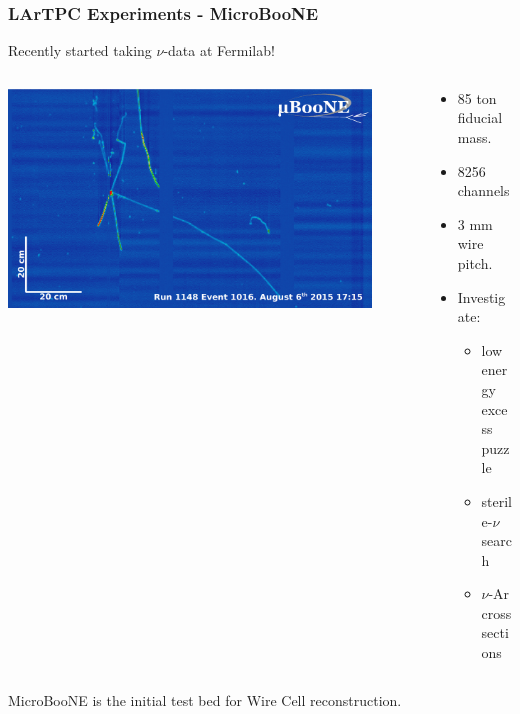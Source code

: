 \begin{frame}
  \frametitle{LArTPC Experiments - MicroBooNE}

  \begin{center}
    Recently started taking $\nu$-data at Fermilab!    
  \end{center}

  \begin{columns}
    \begin{column}{0.5\textwidth}
      \begin{center}
        \includegraphics[width=0.9\textwidth]{run1148_ev1016.png}
      \end{center}

    \end{column}
    \begin{column}{0.5\textwidth}
      \begin{itemize}
      \item 85 ton fiducial mass.
      \item 8256 channels
      \item 3 mm wire pitch.
      \item Investigate:
        \begin{itemize}\footnotesize
        \item low energy excess puzzle
        \item sterile-$\nu$ search
        \item $\nu$-Ar cross sections
        \end{itemize}
      \end{itemize}
    \end{column}
  \end{columns}

  \vspace{3mm}

  \begin{center}
    MicroBooNE is the initial test bed for Wire Cell reconstruction.    
  \end{center}

\end{frame}


